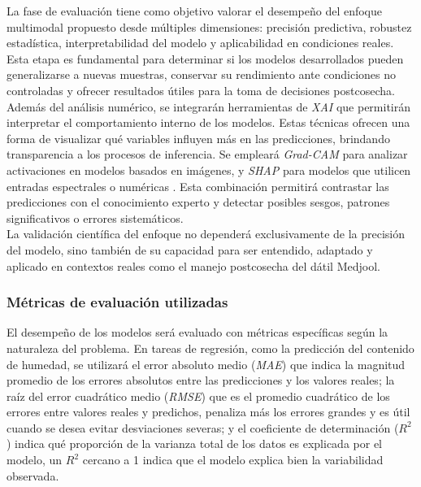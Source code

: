 La fase de evaluación tiene como objetivo valorar el desempeño del enfoque multimodal propuesto desde múltiples dimensiones: precisión predictiva, robustez estadística, interpretabilidad del modelo y aplicabilidad en condiciones reales. Esta etapa es fundamental para determinar si los modelos desarrollados pueden generalizarse a nuevas muestras, conservar su rendimiento ante condiciones no controladas y ofrecer resultados útiles para la toma de decisiones postcosecha.\\

Además del análisis numérico, se integrarán herramientas de \textit{XAI} que permitirán interpretar el comportamiento interno de los modelos. Estas técnicas ofrecen una forma de visualizar qué variables influyen más en las predicciones, brindando transparencia a los procesos de inferencia. Se empleará \textit{Grad-CAM} para analizar activaciones en modelos basados en imágenes, y \textit{SHAP} para modelos que utilicen entradas espectrales o numéricas \parencite{lundberg_unified_2017}. Esta combinación permitirá contrastar las predicciones con el conocimiento experto y detectar posibles sesgos, patrones significativos o errores sistemáticos.\\

La validación científica del enfoque no dependerá exclusivamente de la precisión del modelo, sino también de su capacidad para ser entendido, adaptado y aplicado en contextos reales como el manejo postcosecha del dátil Medjool.

\subsubsection*{Métricas de evaluación utilizadas}

El desempeño de los modelos será evaluado con métricas específicas según la naturaleza del problema. En tareas de regresión, como la predicción del contenido de humedad, se utilizará el error absoluto medio (\textit{MAE}) que indica la magnitud promedio de los errores absolutos entre las predicciones y los valores reales; la raíz del error cuadrático medio (\textit{RMSE}) que es el promedio cuadrático de los errores entre valores reales y predichos, penaliza más los errores grandes y es útil cuando se desea evitar desviaciones severas; y el coeficiente de determinación (\textit{$R^2$}) indica qué proporción de la varianza total de los datos es explicada por el modelo, un \textit{$R^2$} cercano a 1 indica que el modelo explica bien la variabilidad observada.\\

